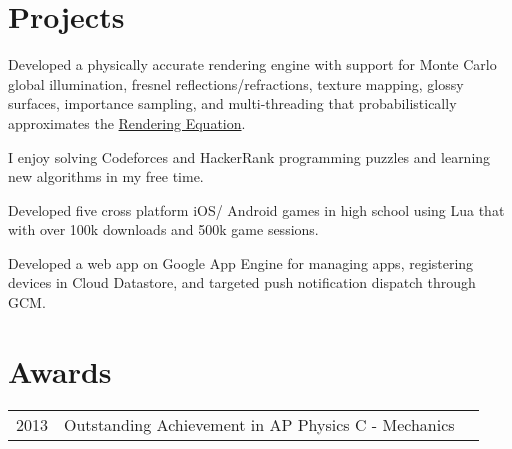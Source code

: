 \documentclass[]{resume}
\begin{document}
\begin{minipage}[t]{0.66\textwidth}

\section{Projects}

\begin{tightemize}
\item Developed a physically accurate rendering engine with support for Monte
Carlo global illumination, fresnel reflections/refractions, texture mapping,
glossy surfaces, importance sampling, and multi-threading that
probabilistically approximates the
\href{https://en.wikipedia.org/wiki/Rendering_equation}{Rendering Equation}.
\end{tightemize}
\sectionsep

\begin{tightemize}
\item I enjoy solving Codeforces and HackerRank programming puzzles and
learning new algorithms in my free time.
\end{tightemize}
\sectionsep

\begin{tightemize}
\item Developed five cross platform iOS/ Android games in high school using Lua
that with over 100k downloads and 500k game sessions.
\end{tightemize}
\sectionsep

\begin{tightemize}
\item Developed a web app on Google App Engine for managing apps, registering
devices in Cloud Datastore, and targeted push notification dispatch through
GCM.
\end{tightemize}
\sectionsep


\section{Awards}
\begin{tabular}{rll}
2013 & Outstanding Achievement in AP Physics C - Mechanics \\
\end{tabular}
\sectionsep

\end{minipage}
\end{document}
